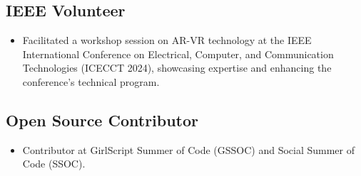 \documentclass[a4paper,10pt]{article}
\begin{document}
\subsection*{IEEE Volunteer}
\begin{itemize}
    \item Facilitated a workshop session on AR-VR technology at the IEEE International Conference on Electrical, Computer, and Communication Technologies (ICECCT 2024), showcasing expertise and enhancing the conference's technical program.
\end{itemize}

\subsection*{Open Source Contributor}
\begin{itemize}
    \item Contributor at GirlScript Summer of Code (GSSOC) and Social Summer of Code (SSOC).
\end{itemize}
\end{document}
